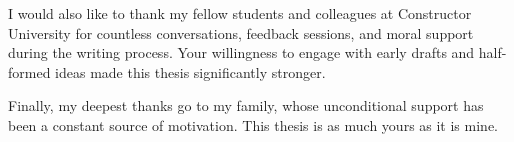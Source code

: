 \documentclass[a4paper,11pt,oneside]{article}
\begin{document}
I would also like to thank my fellow students and colleagues at
Constructor University for countless conversations, feedback sessions,
and moral support during the writing process. Your willingness to
engage with early drafts and half-formed ideas made this thesis
significantly stronger.

Finally, my deepest thanks go to my family, whose unconditional support
has been a constant source of motivation. This thesis is as much yours
as it is mine.

\newpage
\tableofcontents

\clearpage
{}








\newpage
\printbibliography
\end{document}
